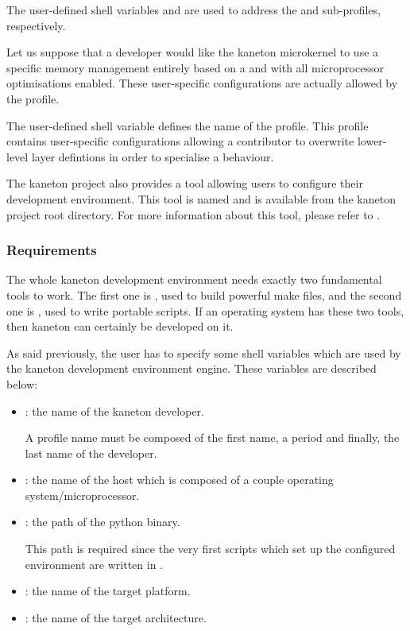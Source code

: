 The user-defined shell variables  and
 are used to address the 
and  sub-profiles, respectively.



Let us suppose that a developer would like the kaneton microkernel to
use a specific memory management entirely based on a 
and with all microprocessor optimisations enabled. These user-specific
configurations are actually allowed by the  profile.

The user-defined shell variable  defines the name
of the  profile. This profile contains user-specific
configurations allowing a contributor to overwrite lower-level layer defintions
in order to specialise a behaviour.

The kaneton project also provides a tool allowing users to configure
their development environment. This tool is named  and is
available from the kaneton project root directory. For more information about
this tool, please refer to .


%
%

\subsubsection{Requirements}

The whole kaneton development environment needs exactly two fundamental tools
to work. The first one is , used to build powerful make files,
and the second one is , used to write portable scripts. If an
operating system has these two tools, then kaneton can certainly be developed
on it.

As said previously, the user has to specify some shell variables which are
used by the kaneton development environment engine. These variables are
described below:

\begin{itemize}
  \item
    : the name of the kaneton developer.

    A  profile name must be composed of the first name, a period
    and finally, the last name of the developer.
  \item
    : the name of the host which is composed of
    a couple operating system/microprocessor.
  \item
    : the path of the python binary.

    This path is required since the very first scripts which set up the
    configured environment are written in .
  \item
    : the name of the target platform.
  \item
    : the name of the target architecture.
\end{itemize}


